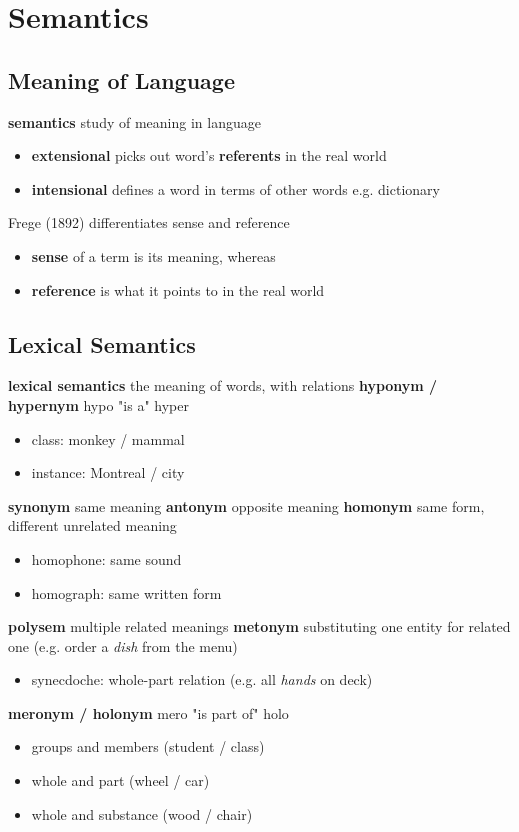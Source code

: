 \documentclass[]{article}
\theoremstyle{definition}
\begin{document}
\section{Semantics}%
\label{sec:semantics}

\subsection{Meaning of Language}%
\label{sub:meaning}

\textbf{semantics} study of meaning in language
\begin{itemize}
    \item \textbf{extensional} picks out word's \textbf{referents} in the real world
    \item \textbf{intensional} defines a word in terms of other words e.g. dictionary
\end{itemize}

Frege (1892) differentiates sense and reference
\begin{itemize}
    \item \textbf{sense} of a term is its meaning, whereas
    \item \textbf{reference} is what it points to in the real world
\end{itemize}

\subsection{Lexical Semantics}%
\label{sub:lexical_semantics}

\textbf{lexical semantics} the meaning of words, with relations
\textbf{hyponym / hypernym} hypo "is a" hyper
\begin{itemize}
    \item class: monkey / mammal
    \item instance: Montreal / city
\end{itemize}
\textbf{synonym} same meaning
\textbf{antonym} opposite meaning
\textbf{homonym} same form, different unrelated meaning
\begin{itemize}
    \item homophone: same sound
    \item homograph: same written form
\end{itemize}
\textbf{polysem} multiple related meanings
\textbf{metonym} substituting one entity for related one (e.g. order a \textit{dish} from the menu)
\begin{itemize}
    \item synecdoche: whole-part relation (e.g. all \textit{hands} on deck)
\end{itemize}
\textbf{meronym / holonym} mero "is part of" holo
\begin{itemize}
    \item groups and members (student / class)
    \item whole and part (wheel / car)
    \item whole and substance (wood / chair)
\end{itemize}
\end{document}
